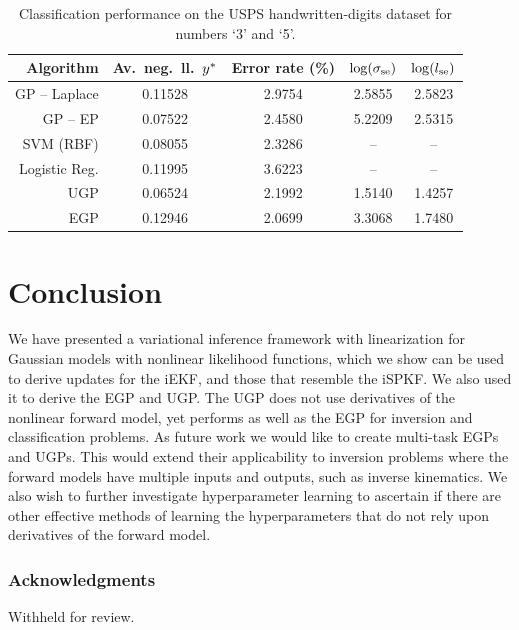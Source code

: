 \documentclass{article} %
\begin{document}
\begin{table}[tb]
    \centering
    \small
    \caption[]{Classification performance on the USPS handwritten-digits
        dataset for numbers `3' and `5'.}
    \begin{tabular}{r| c c c c}
        Algorithm & Av.\ neg.\ ll.\ $y^{*}$ & Error rate (\%) 
            & $\log\!\left({\sigma_\text{se}}\right)$ & $\log\!\left({l_\text{se}}\right)$ \\
        \toprule
        GP -- Laplace & 0.11528 & 2.9754 & 2.5855 & 2.5823 \\
        GP -- EP & 0.07522 & 2.4580 & 5.2209 & 2.5315 \\
        SVM (RBF) & 0.08055 & 2.3286 & -- & -- \\
        Logistic Reg. & 0.11995 & 3.6223 & -- & -- \\
        \midrule
        UGP & 0.06524 & 2.1992 & 1.5140 & 1.4257 \\
        EGP & 0.12946 & 2.0699 & 3.3068 & 1.7480 \\
        \bottomrule
    \end{tabular}
    \label{tab:class}
\end{table}


\section{Conclusion}

We have presented a variational inference framework with linearization for
Gaussian models with nonlinear likelihood functions, which we show can be used
to derive updates for the iEKF, and those that resemble the iSPKF. We also used
it to derive the EGP and UGP. The UGP does not use derivatives of the nonlinear
forward model, yet performs as well as the EGP for inversion and classification
problems.  As future work we would like to create multi-task EGPs and UGPs.
This would extend their applicability to inversion problems where the forward
models have multiple inputs and outputs, such as inverse kinematics. We also
wish to further investigate hyperparameter learning to ascertain if there are
other effective methods of learning the hyperparameters that do not rely upon
derivatives of the forward model. 


\subsubsection*{Acknowledgments}

Withheld for review.



\end{document}
